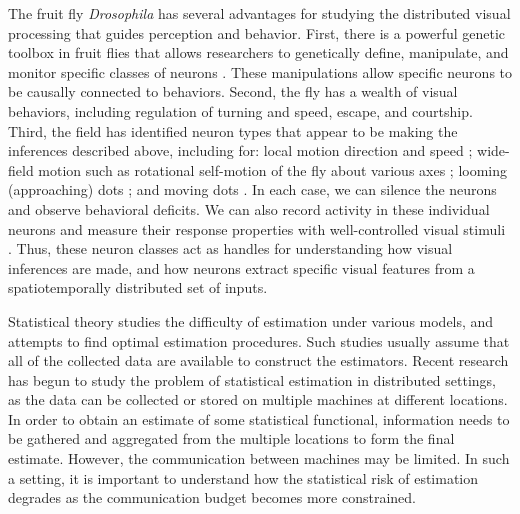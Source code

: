 The fruit fly \textit{Drosophila} has several advantages for studying the
distributed visual processing that guides perception and
behavior. First, there is a powerful genetic toolbox in fruit flies
that allows researchers to genetically define, manipulate, and monitor
specific classes of neurons \citep{luo:08}. These manipulations
allow specific neurons to be causally connected to
behaviors. Second, the fly has a wealth of visual behaviors,
including regulation of turning and speed, escape, and
courtship\citep{card:08,silies:14,spieth:74}.
Third, the field has identified neuron types that
appear to be making the inferences described above, including for: 
local motion direction and speed \citep{Maisak:13};
wide-field motion such as rotational
self-motion of the fly about various axes \citep{joesch:08};
looming (approaching) 
dots \citep{devries:12,klapoetke:17}; and 
moving dots \citep{keles:17}. In each case, we
can silence the neurons and observe behavioral deficits. We can also
record activity in these individual neurons and measure their
response properties with well-controlled visual stimuli
\citep{salazar:16}. Thus, these neuron classes act as
handles for understanding how visual inferences are made, and how
neurons extract specific visual features from a spatiotemporally
distributed set of inputs.


\statbackground{}
Statistical theory studies the difficulty of estimation under
various models, and attempts to find optimal estimation
procedures. Such studies usually assume that all of the collected
data are available to construct the estimators. Recent research
has begun to study the problem of statistical estimation in distributed settings, 
as the data can be collected or
stored on multiple machines at different locations. In order to obtain an estimate of some
statistical functional, information needs to be gathered and
aggregated from the multiple locations to form the final
estimate. However, the communication between machines may be
limited. In such a setting, it is important to understand how the
statistical risk of estimation degrades as the communication budget
becomes more constrained.

